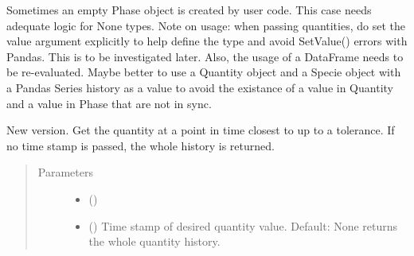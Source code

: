 \documentclass[letterpaper,10pt,openany,oneside,english]{sphinxmanual}
\begin{document}
\begin{fulllineitems}
\begin{fulllineitems}
\begin{quote}
\begin{description}
\end{description}\end{quote}

\end{fulllineitems}


\begin{fulllineitems}
\label{\detokenize{support_rst/phase:phase.Phase.__init__}}
Sometimes an empty Phase object is created by user code. This case needs
adequate logic for None types.
Note on usage: when passing quantities, do set the value argument explicitly
to help define the type and avoid SetValue() errors with Pandas. This is
to be investigated later. Also, the usage of a DataFrame needs to be re-evaluated.
Maybe better to use a Quantity object and a Specie object with a Pandas Series
history as a value to avoid the existance of a value in Quantity and a value
in Phase that are not in sync.

\end{fulllineitems}


\begin{fulllineitems}
\label{\detokenize{support_rst/phase:phase.Phase.get_quantity}}
New version.
Get the quantity  at a point in time closest to
 up to a tolerance. If no time stamp is passed, the
whole history is returned.
\begin{quote}\begin{description}
\item[{Parameters}] \leavevmode\begin{itemize}
\item {} 
 () \textendash{} 

\item {} 
 (\sphinxstyleliteralemphasis{\sphinxupquote{, }}) \textendash{} Time stamp of desired quantity value. Default: None returns the
whole quantity history.


\end{itemize}
\end{description}
\end{quote}
\end{fulllineitems}
\end{fulllineitems}
\end{document}
